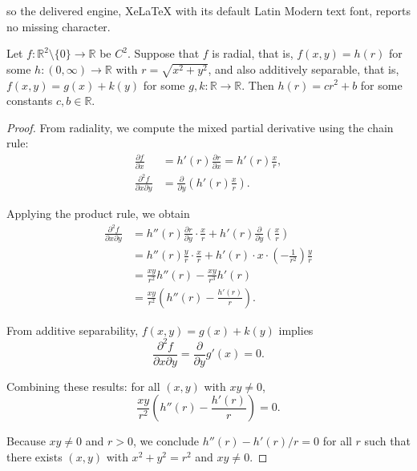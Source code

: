 \documentclass[10pt,a4paper]{amsart}
\newcommand{\R}{\mathbb{R}}
\begin{document}
so the delivered engine, XeLaTeX with its default Latin Modern text font, reports no missing character.
\begin{theorem}
	\label{thm:separability}
	Let $f: \R^2 \setminus \{0\} \to \R$ be $C^2$. Suppose that $f$ is radial, that is, $f(x, y) = h(r)$ for some $h: (0, \infty) \to \R$ with $r = \sqrt{x^2 + y^2}$, and also additively separable, that is, $f(x, y) = g(x) + k(y)$ for some $g, k: \R \to \R$.
	Then $h(r) = cr^2 + b$ for some constants $c, b \in \R$.
\end{theorem}

\begin{proof}
	From radiality, we compute the mixed partial derivative using the chain rule:
	\begin{align}
		\frac{\partial f}{\partial x}              & = h'(r) \frac{\partial r}{\partial x} = h'(r) \frac{x}{r},     \\
		\frac{\partial^2 f}{\partial x \partial y} & = \frac{\partial}{\partial y}\left( h'(r) \frac{x}{r} \right).
	\end{align}

	Applying the product rule, we obtain
	\begin{align}
		\frac{\partial^2 f}{\partial x \partial y} & = h''(r) \frac{\partial r}{\partial y} \cdot \frac{x}{r} + h'(r) \frac{\partial}{\partial y}\left(\frac{x}{r}\right) \\
		                                           & = h''(r) \frac{y}{r} \cdot \frac{x}{r} + h'(r) \cdot x \cdot \left(-\frac{1}{r^2}\right) \frac{y}{r}                 \\
		                                           & = \frac{xy}{r^2} h''(r) - \frac{xy}{r^3} h'(r)                                                                       \\
		                                           & = \frac{xy}{r^2} \left( h''(r) - \frac{h'(r)}{r} \right).
	\end{align}

	From additive separability, $f(x, y) = g(x) + k(y)$ implies
	\[
		\frac{\partial^2 f}{\partial x \partial y} = \frac{\partial}{\partial y} g'(x) = 0.
	\]

	Combining these results: for all $(x, y)$ with $xy \neq 0$,
	\begin{equation}
		\frac{xy}{r^2} \left( h''(r) - \frac{h'(r)}{r} \right) = 0.
		\label{eq:obstruction_ode}
	\end{equation}

	Because $xy \neq 0$ and $r > 0$, we conclude $h''(r) - h'(r)/r = 0$ for all $r$ such that there exists $(x,y)$ with $x^2 + y^2 = r^2$ and $xy \neq 0$.


\end{proof}
\end{document}
